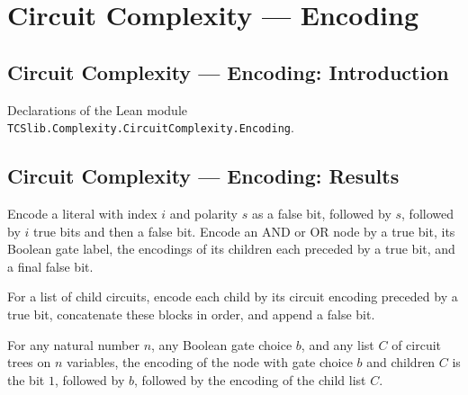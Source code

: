 \section{Circuit Complexity --- Encoding}
\subsection*{Circuit Complexity --- Encoding: Introduction}

Declarations of the Lean module \texttt{TCSlib.Complexity.CircuitComplexity.Encoding}.

\subsection*{Circuit Complexity --- Encoding: Results}

\begin{definition}
\label{BoolCircuit.encodeCircuit}
\leanok
{}
Encode a literal with index $i$ and polarity $s$ as a false bit, followed by $s$,
followed by $i$ true bits and then a false bit. Encode an AND or OR node by a true bit,
its Boolean gate label, the encodings of its children each preceded by a true bit, and a
final false bit.
\end{definition}

\begin{definition}
\label{BoolCircuit.encodeChildren}
\leanok
{}
For a list of child circuits, encode each child by its circuit encoding preceded by a
true bit, concatenate these blocks in order, and append a false bit.
\end{definition}

\begin{theorem}
\label{BoolCircuit.encodeCircuit_node}
\leanok
{}
For any natural number $n$, any Boolean gate choice $b$, and any list $C$ of circuit
trees on $n$ variables, the encoding of the node with gate choice $b$ and children $C$
is the bit $1$, followed by $b$, followed by the encoding of the child list $C$.
\end{theorem}

